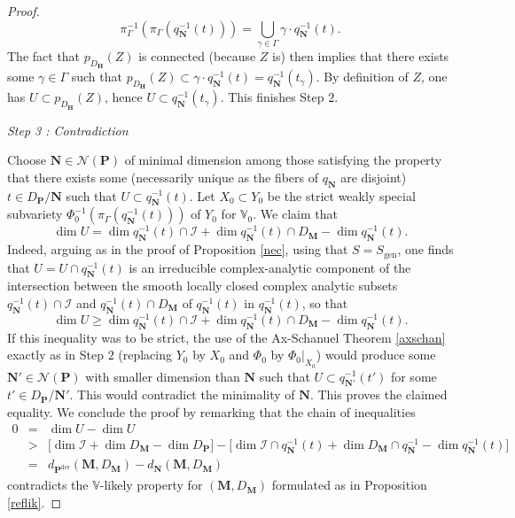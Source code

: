 \documentclass[10pt]{article}
\numberwithin{equation}{subsection}
\theoremstyle{plain}
\theoremstyle{definition}
\theoremstyle{remark}
\newcommand{\I}{\mathscr{I}}
\newcommand{\V}{\mathbb V}
\newcommand{\pp}{\mathbf P}
\newcommand{\mon}{\mathbf H}
\newcommand{\M}{\mathbf M}
\newcommand{\NN}{\mathbf N}
\newcommand{\der}{\mathrm{der}}
\newcommand{\Np}{\mathcal{N}(\pp)}
\newcommand{\gen}{\mathrm{gen}}
\begin{document}
\begin{proof}
\[
\pi_\Gamma^{-1}(\pi_\Gamma(q_\NN^{-1}(t))) = \bigcup_{\gamma \in \Gamma} \gamma \cdot q_\NN^{-1}(t).
\]
The fact that $p_{D_{\mon}}(Z)$ is connected (because $Z$ is) then implies that there exists some $\gamma \in \Gamma$ such that $p_{D_{\mon}}(Z) \subset \gamma \cdot q_\NN^{-1}(t) = q_\NN^{-1}(t_\gamma)$. By definition of $Z$, one has $U \subset p_{D_{\mon}}(Z)$, hence $U \subset q_\NN^{-1}(t_\gamma)$. This finishes Step $2$.

\noindent \textit{Step 3 : Contradiction}

Choose $\NN \in \Np$ of minimal dimension among those satisfying the property that there exists some (necessarily unique as the fibers of $q_\NN$ are disjoint) $t \in D_\pp/\NN$ such that $U \subset q_\NN^{-1}(t)$. Let $X_0 \subset Y_0$ be the strict weakly special subvariety $\Phi_0^{-1}(\pi_\Gamma(q_\NN^{-1}(t)))$ of $Y_0$ for $\V_0$. We claim that
\[
\dim U = \dim q_\NN^{-1}(t) \cap \I + \dim q_\NN^{-1}(t) \cap D_\M - \dim q_\NN^{-1}(t).
\]
Indeed, arguing as in the proof of Proposition \ref{nec}, using that $S = S_\gen$, one finds that $U = U \cap q_\NN^{-1}(t)$ is an irreducible complex-analytic component of the intersection between the smooth locally closed complex analytic subsets $q_\NN^{-1}(t) \cap \I$ and $q_\NN^{-1}(t) \cap D_\M$ of $q_\NN^{-1}(t)$ in $q_\NN^{-1}(t)$, so that
\[
\dim U \geqslant \dim q_\NN^{-1}(t) \cap \I + \dim q_\NN^{-1}(t) \cap D_\M - \dim q_\NN^{-1}(t).
\]
If this inequality was to be strict, the use of the Ax-Schanuel Theorem \ref{axschan} exactly as in Step $2$ (replacing $Y_0$ by $X_0$ and $\Phi_0$ by $\Phi_0\vert_{X_0}$) would produce some $\NN' \in \Np$ with smaller dimension than $\NN$ such that $U \subset q_{\NN'}^{-1}(t')$ for some $t' \in D_\pp/\NN'$. This would contradict the minimality of $\NN$. This proves the claimed equality. We conclude the proof by remarking that the chain of inequalities
\begin{eqnarray*}
0 & = & \dim U - \dim U \\
& > & \big[\dim \I + \dim D_\M - \dim D_\pp \big] - \big[\dim \I \cap q_\NN^{-1}(t) + \dim D_\M \cap q_\NN^{-1} - \dim q_\NN^{-1}(t)\big] \\
& = & d_{\pp^\der}(\M, D_\M) - d_\NN(\M, D_\M)
\end{eqnarray*}
contradicts the $\V$-likely property for $(\M,D_\M)$ formulated as in Proposition \ref{reflik}.
\end{proof}
\end{document}
